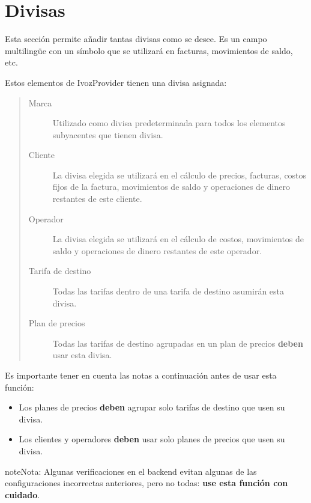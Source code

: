 \documentclass[letterpaper,10pt,spanish]{sphinxmanual}
\begin{document}
\section{Divisas}
\label{administration_portal/platform/currencies:currencies}\label{administration_portal/platform/currencies::doc}
Esta sección permite añadir tantas divisas como se desee. Es un campo multilingüe con un símbolo que se utilizará en facturas, movimientos de saldo, etc.

Estos elementos de IvozProvider tienen una divisa asignada:
\begin{quote}
\begin{description}
\item[{Marca}] \leavevmode
Utilizado como divisa predeterminada para todos los elementos subyacentes que tienen divisa.

\item[{Cliente}] \leavevmode
La divisa elegida se utilizará en el cálculo de precios, facturas, costos fijos de la factura, movimientos de saldo y operaciones de dinero restantes de este cliente.

\item[{Operador}] \leavevmode
La divisa elegida se utilizará en el cálculo de costos, movimientos de saldo y operaciones de dinero restantes de este operador.

\item[{Tarifa de destino}] \leavevmode
Todas las tarifas dentro de una tarifa de destino asumirán esta divisa.

\item[{Plan de precios}] \leavevmode
Todas las tarifas de destino agrupadas en un plan de precios \textbf{deben} usar esta divisa.

\end{description}
\end{quote}

Es importante tener en cuenta las notas a continuación antes de usar esta función:
\begin{itemize}
\item {} 
Los planes de precios \textbf{deben} agrupar solo tarifas de destino que usen su divisa.

\item {} 
Los clientes y operadores \textbf{deben} usar solo planes de precios que usen su divisa.

\end{itemize}

\begin{notice}{note}{Nota:}
Algunas verificaciones en el backend evitan algunas de las configuraciones incorrectas anteriores, pero no todas: \textbf{use esta función con cuidado}.
\end{notice}
\end{document}

